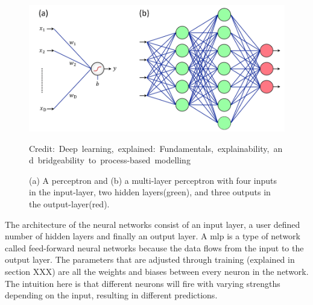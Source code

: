             \begin{figure}[H]
                \centering
                \includegraphics[scale=0.5]{figures/perceptron.png}
                \caption{(a) A perceptron and (b) a multi-layer perceptron with four inputs in the input-layer, two hidden layers(green), and three outputs in the output-layer(red).}
              	\medskip 
            	\hspace*{15pt}\hbox{\scriptsize Credit: Deep learning, explained: Fundamentals, explainability, and bridgeability
        to process-based modelling\cite{razavi2021deep_exp_DL}}
                \label{Perceptron / MLP}
            \end{figure}
        
        The architecture of the neural networks consist of an input layer, a user defined number of hidden layers and finally an output layer. A \gls{mlp} is a type of network called feed-forward neural networks because the data flows from the input to the output layer. The parameters that are adjusted through training (explained in section XXX) are all the weights and biases between every neuron in the network. The intuition here is that different neurons will fire with varying strengths depending on the input, resulting in different predictions.
        
